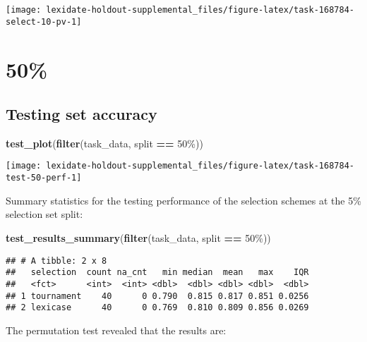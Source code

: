 \documentclass[
]{book}
\newenvironment{Shaded}{\begin{snugshade}}{\end{snugshade}}
\newcommand{\FunctionTok}[1]{\textcolor[rgb]{0.13,0.29,0.53}{\textbf{#1}}}
\newcommand{\NormalTok}[1]{#1}
\newcommand{\SpecialCharTok}[1]{\textcolor[rgb]{0.81,0.36,0.00}{\textbf{#1}}}
\newcommand{\StringTok}[1]{\textcolor[rgb]{0.31,0.60,0.02}{#1}}
\begin{document}
\texttt{[image: lexidate-holdout-supplemental\_files/figure-latex/task-168784-select-10-pv-1]}

\hypertarget{section-52}{%
\section{50\%}\label{section-52}}

\hypertarget{testing-set-accuracy-52}{%
\subsection{Testing set accuracy}\label{testing-set-accuracy-52}}

\begin{Shaded}
\begin{Highlighting}[]
\FunctionTok{test\_plot}\NormalTok{(}\FunctionTok{filter}\NormalTok{(task\_data, split }\SpecialCharTok{==} \StringTok{\textquotesingle{}50\%\textquotesingle{}}\NormalTok{))}
\end{Highlighting}
\end{Shaded}

\texttt{[image: lexidate-holdout-supplemental\_files/figure-latex/task-168784-test-50-perf-1]}

Summary statistics for the testing performance of the selection schemes at the 5\% selection set split:

\begin{Shaded}
\begin{Highlighting}[]
\FunctionTok{test\_results\_summary}\NormalTok{(}\FunctionTok{filter}\NormalTok{(task\_data, split }\SpecialCharTok{==} \StringTok{\textquotesingle{}50\%\textquotesingle{}}\NormalTok{))}
\end{Highlighting}
\end{Shaded}

\begin{verbatim}
## # A tibble: 2 x 8
##   selection  count na_cnt   min median  mean   max    IQR
##   <fct>      <int>  <int> <dbl>  <dbl> <dbl> <dbl>  <dbl>
## 1 tournament    40      0 0.790  0.815 0.817 0.851 0.0256
## 2 lexicase      40      0 0.769  0.810 0.809 0.856 0.0269
\end{verbatim}

The permutation test revealed that the results are:
\end{document}
